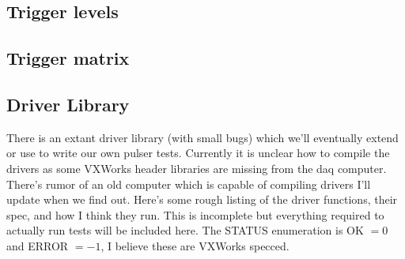 \documentclass[11pt]{article}
\begin{document}
	\subsection{Trigger levels}
	
	\subsection{Trigger matrix}
	
	\subsection{Driver Library}
	There is an extant driver library (with small bugs) which we'll eventually extend or use to write our own pulser tests. Currently it is unclear how to compile the drivers as some VXWorks header libraries are missing from the daq computer. There's rumor of an old computer which is capable of compiling drivers I'll update when we find out. Here's some rough listing of the driver functions, their spec, and how I think they run. This is incomplete but everything required to actually run tests will be included here. The STATUS enumeration is OK $=0$ and ERROR $=-1$, I believe these are VXWorks specced. 
	
\end{document}
